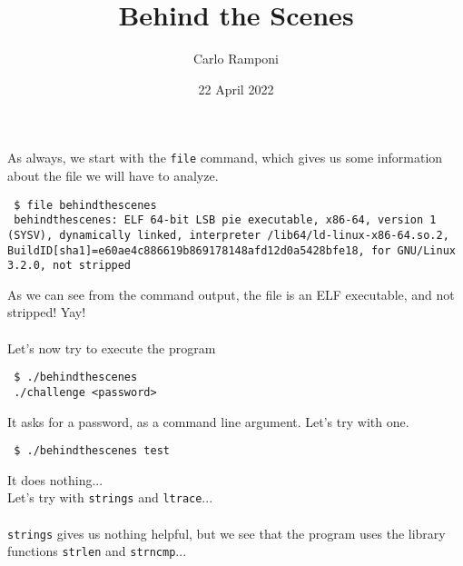 \documentclass{article}
\title{Behind the Scenes}
\author{Carlo Ramponi}
\date{22 April 2022}
\begin{document}


\lstset{style=mystyle}

\maketitle

\noindent
As always, we start with the \texttt{file} command, which gives us some information about the file we will have to analyze.

\begin{lstlisting}
 $ file behindthescenes
 behindthescenes: ELF 64-bit LSB pie executable, x86-64, version 1 (SYSV), dynamically linked, interpreter /lib64/ld-linux-x86-64.so.2, BuildID[sha1]=e60ae4c886619b869178148afd12d0a5428bfe18, for GNU/Linux 3.2.0, not stripped
\end{lstlisting}

\noindent
As we can see from the command output,
the file is an ELF executable, and not stripped! Yay!
\\\\

\noindent
Let's now try to execute the program

\begin{lstlisting}
 $ ./behindthescenes
 ./challenge <password>
\end{lstlisting}

\noindent
It asks for a password, as a command line argument. Let's try with one.

\begin{lstlisting}
 $ ./behindthescenes test
\end{lstlisting}

\noindent
It does nothing...\\
Let's try with \texttt{strings} and \texttt{ltrace}...\\
\\
\texttt{strings} gives us nothing helpful, but we see that the program uses the library functions \texttt{strlen} and \texttt{strncmp}...
\end{document}
